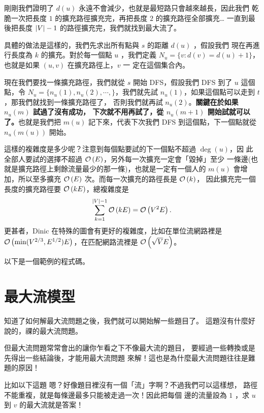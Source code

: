 \documentclass[a4paper,12pt]{book}
\begin{document}
剛剛我們證明了 $d(u)$ 永遠不會減少，也就是最短路只會越來越長，因此我們
乾脆一次把長度 $1$ 的擴充路徑擴充完，再把長度 $2$ 的擴充路徑全部擴充…
一直到最後把長度 $\lvert V \rvert - 1$ 的路徑擴充完，我們就找到最大流了。

具體的做法是這樣的，我們先求出所有點與 $s$ 的距離 $d(u)$ ，假設我們
現在再進行長度為 $k$ 的擴充。對於每一個點 $u$ ，我們定義 $N_u = 
\{ v: d(v) = d(u) + 1 \}$，也就是如果 $(u, v)$ 在擴充路徑上，$v$ 一
定在這個集合內。 

現在我們要找一條擴充路徑，我們就從 $s$ 開始 DFS，假設我們 DFS 到了
$u$ 這個點，令 $N_u = \{ n_u(1), n_u(2), \cdots, \}$，我們就先試
$n_u(1)$，如果這個點可以走到 $t$，那我們就找到一條擴充路徑了，
否則我們就再試 $n_u(2)$。{\bf 關鍵在於如果 $n_u(m)$ 試過了沒有成功，
下次就不用再試了，從 $n_u(m+1)$ 開始試就可以了。}也就是我們把 $m(u)$
記下來，代表下次我們 DFS 到這個點，下一個點就從 $n_u(m(u))$ 開始。

這樣的複雜度是多少呢？注意到每個點要試的下一個點不超過 $\deg(u)$，因
此全部人要試的選擇不超過 $\operatorname{\mathcal{O}}\left(E\right)$，另外每一次擴充一定會「毀掉」至少
一條邊(也就是擴充路徑上剩餘流量最少的那一條)，也就是一定有一個人的
$m(u)$ 會增加，所以至多擴充 $\operatorname{\mathcal{O}}\left(E\right)$ 次。而每一次擴充的路徑長是 $\operatorname{\mathcal{O}}\left(k\right)$，
因此擴充完一個長度的擴充路徑要 $\operatorname{\mathcal{O}}\left(kE\right)$，總複雜度是
\[ \sum_{k = 1}^{\lvert V \rvert-1} \operatorname{\mathcal{O}}\left(kE\right) = \operatorname{\mathcal{O}}\left(V^2 E\right). \] 
更甚者，Dinic 在特殊的圖會有更好的複雜度，比如在單位流網路裡是
$\operatorname{\mathcal{O}}\left(\min(V^{2/3}, E^{1/2}) E\right)$，在匹配網路流裡是 $\operatorname{\mathcal{O}}\left(\sqrt{V}E\right)$。

以下是一個範例的程式碼。


\section{最大流模型}
知道了如何解最大流問題之後，我們就可以開始解一些題目了。
這題沒有什麼好說的，祼的最大流問題。 

但最大流問題常常會出的讓你乍看之下不像最大流的題目，
要經過一些轉換或是先得出一些結論後，才能用最大流問題
來解！這也是為什麼最大流問題往往是難題的原因！

比如以下這題
嗯？好像題目裡沒有一個「流」字啊？不過我們可以這樣想，
路徑不能重複，就是每條邊最多只能被走過一次！因此把每個
邊的流量設為 $1$ ，求 $u$ 到 $v$ 的最大流就是答案！
\end{document}
